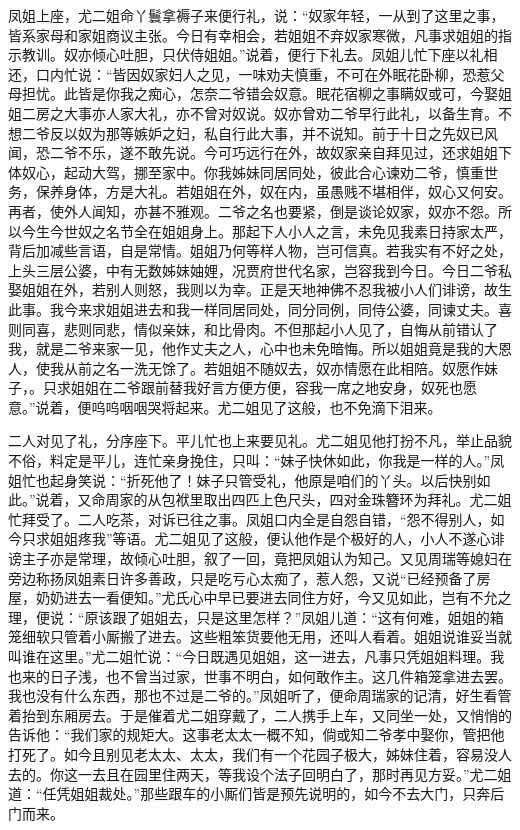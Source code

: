 凤姐上座，尤二姐命丫鬟拿褥子来便行礼，说：``奴家年轻，一从到了这里之事，皆系家母和家姐商议主张。今日有幸相会，若姐姐不弃奴家寒微，凡事求姐姐的指示教训。奴亦倾心吐胆，只伏侍姐姐。''说着，便行下礼去。凤姐儿忙下座以礼相还，口内忙说：``皆因奴家妇人之见，一味劝夫慎重，不可在外眠花卧柳，恐惹父母担忧。此皆是你我之痴心，怎奈二爷错会奴意。眠花宿柳之事瞒奴或可，今娶姐姐二房之大事亦人家大礼，亦不曾对奴说。奴亦曾劝二爷早行此礼，以备生育。不想二爷反以奴为那等嫉妒之妇，私自行此大事，并不说知。前于十日之先奴已风闻，恐二爷不乐，遂不敢先说。今可巧远行在外，故奴家亲自拜见过，还求姐姐下体奴心，起动大驾，挪至家中。你我姊妹同居同处，彼此合心谏劝二爷，慎重世务，保养身体，方是大礼。若姐姐在外，奴在内，虽愚贱不堪相伴，奴心又何安。再者，使外人闻知，亦甚不雅观。二爷之名也要紧，倒是谈论奴家，奴亦不怨。所以今生今世奴之名节全在姐姐身上。那起下人小人之言，未免见我素日持家太严，背后加减些言语，自是常情。姐姐乃何等样人物，岂可信真。若我实有不好之处，上头三层公婆，中有无数姊妹妯娌，况贾府世代名家，岂容我到今日。今日二爷私娶姐姐在外，若别人则怒，我则以为幸。正是天地神佛不忍我被小人们诽谤，故生此事。我今来求姐姐进去和我一样同居同处，同分同例，同侍公婆，同谏丈夫。喜则同喜，悲则同悲，情似亲妹，和比骨肉。不但那起小人见了，自悔从前错认了我，就是二爷来家一见，他作丈夫之人，心中也未免暗悔。所以姐姐竟是我的大恩人，使我从前之名一洗无馀了。若姐姐不随奴去，奴亦情愿在此相陪。奴愿作妹子，。只求姐姐在二爷跟前替我好言方便方便，容我一席之地安身，奴死也愿意。''说着，便呜呜咽咽哭将起来。尤二姐见了这般，也不免滴下泪来。

二人对见了礼，分序座下。平儿忙也上来要见礼。尤二姐见他打扮不凡，举止品貌不俗，料定是平儿，连忙亲身挽住，只叫：``妹子快休如此，你我是一样的人。''凤姐忙也起身笑说：``折死他了！妹子只管受礼，他原是咱们的丫头。以后快别如此。''说着，又命周家的从包袱里取出四匹上色尺头，四对金珠簪环为拜礼。尤二姐忙拜受了。二人吃茶，对诉已往之事。凤姐口内全是自怨自错，``怨不得别人，如今只求姐姐疼我''等语。尤二姐见了这般，便认他作是个极好的人，小人不遂心诽谤主子亦是常理，故倾心吐胆，叙了一回，竟把凤姐认为知己。又见周瑞等媳妇在旁边称扬凤姐素日许多善政，只是吃亏心太痴了，惹人怨，又说``已经预备了房屋，奶奶进去一看便知。''尤氏心中早已要进去同住方好，今又见如此，岂有不允之理，便说：``原该跟了姐姐去，只是这里怎样？''凤姐儿道：``这有何难，姐姐的箱笼细软只管着小厮搬了进去。这些粗笨货要他无用，还叫人看着。姐姐说谁妥当就叫谁在这里。''尤二姐忙说：``今日既遇见姐姐，这一进去，凡事只凭姐姐料理。我也来的日子浅，也不曾当过家，世事不明白，如何敢作主。这几件箱笼拿进去罢。我也没有什么东西，那也不过是二爷的。''凤姐听了，便命周瑞家的记清，好生看管着抬到东厢房去。于是催着尤二姐穿戴了，二人携手上车，又同坐一处，又悄悄的告诉他：``我们家的规矩大。这事老太太一概不知，倘或知二爷孝中娶你，管把他打死了。如今且别见老太太、太太，我们有一个花园子极大，姊妹住着，容易没人去的。你这一去且在园里住两天，等我设个法子回明白了，那时再见方妥。''尤二姐道：``任凭姐姐裁处。''那些跟车的小厮们皆是预先说明的，如今不去大门，只奔后门而来。

